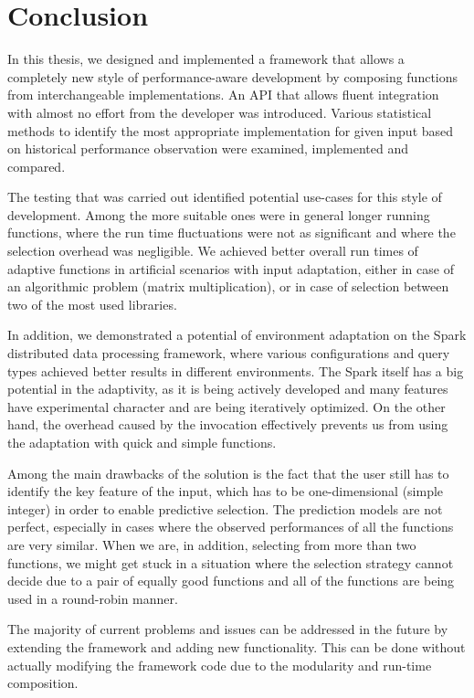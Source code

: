 \chapter*{Conclusion}

In this thesis, we designed and implemented a framework that allows a completely new style of performance-aware development by composing functions from interchangeable implementations. An API that allows fluent integration with almost no effort from the developer was introduced. Various statistical methods to identify the most appropriate implementation for given input based on historical performance observation were examined, implemented and compared.

The testing that was carried out identified potential use-cases for this style of development. Among the more suitable ones were in general longer running functions, where the run time fluctuations were not as significant and where the selection overhead was negligible. We achieved better overall run times of adaptive functions in artificial scenarios with input adaptation, either in case of an algorithmic problem (matrix multiplication), or in case of selection between two of the most used libraries.

In addition, we demonstrated a potential of environment adaptation on the Spark distributed data processing framework, where various configurations and query types achieved better results in different environments. The Spark itself has a big potential in the adaptivity, as it is being actively developed and many features have experimental character and are being iteratively optimized. On the other hand, the overhead caused by the invocation effectively prevents us from using the adaptation with quick and simple functions.

Among the main drawbacks of the solution is the fact that the user still has to identify the key feature of the input, which has to be one-dimensional (simple integer) in order to enable predictive selection. The prediction models are not perfect, especially in cases where the observed performances of all the functions are very similar. When we are, in addition, selecting from more than two functions, we might get stuck in a situation where the selection strategy cannot decide due to a pair of equally good functions and all of the functions are being used in a round-robin manner.

The majority of current problems and issues can be addressed in the future by extending the framework and adding new functionality. This can be done without actually modifying the framework code due to the modularity and run-time composition.

